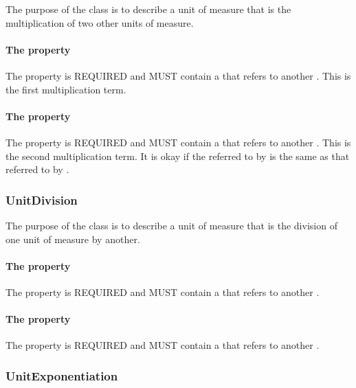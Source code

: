 The purpose of the  class is to describe a unit of measure that is the multiplication of two other units of measure. 

\paragraph{The  property}\label{sec:hasTerm1}
The  property is REQUIRED and MUST contain a  that refers to another . This  is the first multiplication term.

\paragraph{The  property}\label{sec:hasTerm2}
The  property is REQUIRED and MUST contain a  that refers to another . This  is the second multiplication term. It is okay if the  referred to by  is the same as that referred to by .

\subsubsection{UnitDivision}
\label{sec:UnitDivision}

The purpose of the  class is to describe a unit of measure that is the division of one unit of measure by another.

\paragraph{The  property}\label{sec:hasNumerator}
The  property is REQUIRED and MUST contain a  that refers to another .

\paragraph{The  property}\label{sec:hasDenominator}
The  property is REQUIRED and MUST contain a  that refers to another .

\subsubsection{UnitExponentiation}
\label{sec:UnitExponentiation}

